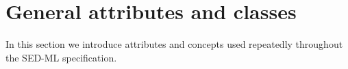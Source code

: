 \section{General attributes and classes}
In this section we introduce attributes and concepts used repeatedly throughout the SED-ML specification. 


















